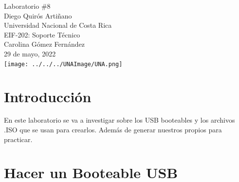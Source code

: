 \documentclass[stu, 12pt, letterpaper, donotrepeattitle, floatsintext, natbib, helv]{apa7}
\begin{document}
\begin{titlepage}
    \centering
    \vfill
    \LARGE Laboratorio \#8\\
    \vskip2cm
    \large Diego Quirós Artiñano \\
    Universidad Nacional de Costa Rica \\
    EIF-202: Soporte Técnico \\ 
    Carolina Gómez Fernández \\
    29 de mayo, 2022 \\
    \vfill
    \texttt{[image: ../../../UNAImage/UNA.png]} \\
    \vfill
    \vfill
\end{titlepage}

\addto{}
\tableofcontents
\setcounter{tocdepth}{2}
\newpage
\renewcommand{\listfigurename}{\largeÍndice de fíguras}
\listoffigures
\newpage


\section*{Introducción}
{}

En este laboratorio se va a investigar sobre los USB booteables y los archivos .ISO que se usan para crearlos. Además de generar nuestros propios para practicar.

\section*{Hacer un Booteable USB}
{}
\end{document}
